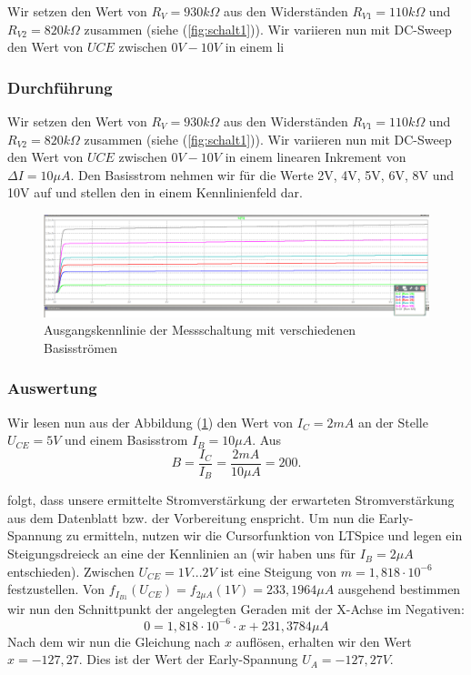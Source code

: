 \documentclass{article}
\begin{document}
Wir setzen den Wert von $R_{V} = 930k\Omega$ aus den Widerständen $R_{V1} = 110k\Omega$ und $R_{V2} = 820k\Omega$ zusammen (siehe (\ref{fig:schalt1})). Wir variieren nun mit DC-Sweep den Wert von $UCE$ zwischen $0V-10V$ in einem li
\newpage



\subsubsection{Durchführung}
Wir setzen den Wert von $R_{V} = 930k\Omega$ aus den Widerständen $R_{V1} = 110k\Omega$ und $R_{V2} = 820k\Omega$ zusammen (siehe (\ref{fig:schalt1})). Wir variieren nun mit DC-Sweep den Wert von $UCE$ zwischen $0V-10V$ in einem linearen Inkrement von $\Delta I = 10\mu A$. Den Basisstrom nehmen wir für die Werte 2V, 4V, 5V, 6V, 8V und 10V auf und stellen den in einem Kennlinienfeld dar.

\begin{figure}[h]
  \centering
  \includegraphics[width=\textwidth]{../assets/images/EL1P3/ausgangskennlinie.png}
  \caption{Ausgangskennlinie der Messschaltung mit verschiedenen Basisströmen}
  \label{fig:ausgang}
\end{figure}

\subsubsection{Auswertung}

Wir lesen nun aus der Abbildung (\ref{fig:ausgang}) den Wert von $I_{C} = 2mA$ an der Stelle $U_{CE} = 5V$ und einem Basisstrom $I_{B} = 10\mu A$. Aus
\begin{equation}
  \label{eq:3}
  B = \frac{I_{C}}{I_{B}} = \frac{2mA}{10\mu A} = 200.
\end{equation}

folgt, dass unsere ermittelte Stromverstärkung der erwarteten Stromverstärkung aus dem Datenblatt bzw. der Vorbereitung enspricht. Um nun die Early-Spannung zu ermitteln, nutzen wir die Cursorfunktion von LTSpice und legen ein Steigungsdreieck an eine der Kennlinien an (wir haben uns für $I_{B} = 2\mu A$ entschieden). Zwischen $U_{CE} = 1V...2V$ ist eine Steigung von $m = 1,818\cdot 10^{-6}$ festzustellen. Von $f_{I_{B1}}(U_{CE}) = f_{2\mu A}(1V) = 233,1964\mu A$ ausgehend bestimmen wir nun den Schnittpunkt der angelegten Geraden mit der X-Achse im Negativen:
\begin{equation}
  \label{eq:4}
  0 = 1,818\cdot 10^{-6}\cdot x + 231,3784\mu A
\end{equation}
Nach dem wir nun die Gleichung nach $x$ auflösen, erhalten wir den Wert $x = -127,27$. Dies ist der Wert der Early-Spannung $U_{A} = -127,27V$.
\newpage
\end{document}
